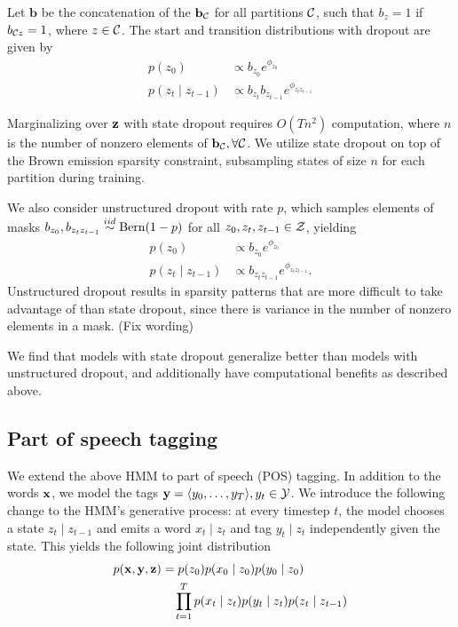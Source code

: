 \documentclass[11pt,a4paper]{article}
\begin{document}
Let $\mathbf{b}$ be the concatenation of the $\mathbf{b}_{\mathcal{C}}$ for all partitions $\mathcal{C}$,
such that $b_z = 1$ if $b_{\mathcal{C} z} = 1$, where $z \in \mathcal{C}$.
The start and transition distributions with dropout are given by
\begin{equation}
\label{eqn:state_dropout}
\begin{aligned}
p(z_0) &\propto b_{z_0}e^{\phi_{z_0}}\\
p(z_t \mid z_{t-1}) &\propto b_{z_t}b_{z_{t-1}}e^{\phi_{z_tz_{t-1}}}
\end{aligned}
\end{equation}

Marginalizing over $\mathbf{z}$ with state dropout requires $O(Tn^2)$ computation,
where $n$ is the number of nonzero elements of $\mathbf{b}_{\mathcal{C}}, \forall \mathcal{C}$.
We utilize state dropout on top of the Brown emission sparsity constraint,
subsampling states of size $n$ for each partition during training.

We also consider unstructured dropout with rate $p$,
which samples elements of masks $b_{z_0}, b_{z_tz_{t-1}}\overset{iid}{\sim} \mathrm{Bern}(1-p)$
for all $z_0, z_t, z_{t-1}\in\mathcal{Z}$, yielding
\begin{equation}
\label{eqn:unstructured_dropout}
\begin{aligned}
p(z_0) &\propto b_{z_0}e^{\phi_{z_0}}\\
p(z_t \mid z_{t-1}) &\propto b_{z_tz_{t-1}}e^{\phi_{z_tz_{t-1}}}.
\end{aligned}
\end{equation}
Unstructured dropout results in sparsity patterns that are
more difficult to take advantage of than state dropout,
since there is variance in the number of nonzero elements
in a mask.
(Fix wording)

We find that models with state dropout
generalize better than models with unstructured dropout,
and additionally have computational benefits as described above.

\subsection{Part of speech tagging}
We extend the above HMM to part of speech (POS) tagging.
In addition to the words $\mathbf{x}$,
we model the tags $\mathbf{y} = \langle y_0, \ldots, y_T\rangle,y_t \in \mathcal{Y}$.
We introduce the following change to the HMM's generative process:
at every timestep $t$, the model chooses a state $z_t \mid z_{t-1}$ 
and emits a word $x_t \mid z_t$ and tag $y_t \mid z_t$ independently given the state.
This yields the following joint distribution
\begin{equation}
\begin{aligned}
p(\mathbf{x}, \mathbf{y}, \mathbf{z})
&= p(z_0)p(x_0 \mid z_0)p(y_0 \mid z_0)\\
&\quad \prod_{t=1}^T p(x_t\mid z_t)p(y_t \mid z_t)p(z_t \mid z_{t-1})
\end{aligned}
\end{equation}
\end{document}
